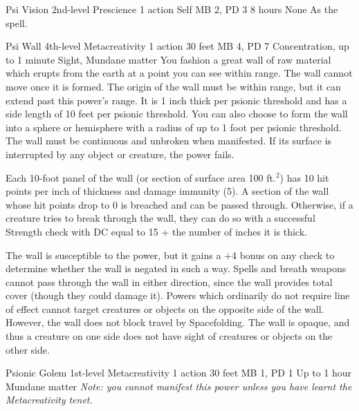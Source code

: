 \DndPowerHeader%
    {Psi Vision\label{pwr:psi-vision}}
    {2nd-level Prescience}
    {1 action}
    {Self}
    {MB 2, PD 3}
    {8 hours}
    {None}
As the  spell.

\DndPowerHeader%
    {Psi Wall\label{pwr:psi-wall}}
    {4th-level Metacreativity}
    {1 action}
    {30 feet}
    {MB 4, PD 7}
    {Concentration, up to 1 minute}
    {Sight, Mundane matter}
You fashion a great wall of raw material
which erupts from the earth at a point you can see within
range. The wall cannot move once it is formed. The origin
of the wall must be within range, but it can extend past this
power's range. It is 1 inch thick per psionic threshold and
has a side length of 10 feet per psionic threshold. You can
also choose to form the wall into a sphere or hemisphere with
a radius of up to 1 foot per psionic threshold. The wall must
be continuous and unbroken when manifested. If its surface
is interrupted by any object or creature, the power fails.

Each 10-foot panel of the wall (or section of surface area
100 ft.$^2$) has 10 hit points per inch of thickness and damage
immunity (5). A section of the wall whose hit points drop
to 0 is breached and can be passed through. Otherwise, if
a creature tries to break through the wall, they can do so
with a successful Strength check with DC equal to 15 + the
number of inches it is thick.

The wall is susceptible to the  power,
but it gains a +4 bonus on any check to determine whether
the wall is negated in such a way. Spells and breath weapons
cannot pass through the wall in either direction, since the
wall provides total cover (though they could damage it). Powers
which ordinarily do not require line of effect cannot target
creatures or objects on the opposite side of the wall. However,
the wall does not block travel by Spacefolding. The wall is
opaque, and thus a creature on one side does not have sight
of creatures or objects on the other side.

\DndPowerHeader%
    {Psionic Golem\label{pwr:psionic-golem}}
    {1st-level Metacreativity}
    {1 action}
    {30 feet}
    {MB 1, PD 1}
    {Up to 1 hour}
    {Mundane matter}
\emph{Note: you cannot manifest this power
unless you have learnt the  Metacreativity tenet.}

